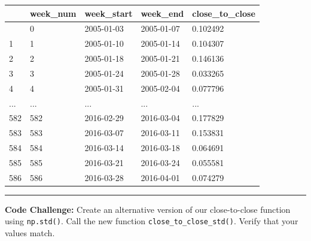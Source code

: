 \documentclass[
  letterpaper,
  DIV=11,
  numbers=noendperiod]{scrreprt}
\begin{document}
\begin{longtable}[]{@{}lllll@{}}
\toprule\noalign{}
& week\_num & week\_start & week\_end & close\_to\_close \\
\midrule\noalign{}
\endhead
\bottomrule\noalign{}
\endlastfoot
0 & 0 & 2005-01-03 & 2005-01-07 & 0.102492 \\
1 & 1 & 2005-01-10 & 2005-01-14 & 0.104307 \\
2 & 2 & 2005-01-18 & 2005-01-21 & 0.146136 \\
3 & 3 & 2005-01-24 & 2005-01-28 & 0.033265 \\
4 & 4 & 2005-01-31 & 2005-02-04 & 0.077796 \\
... & ... & ... & ... & ... \\
582 & 582 & 2016-02-29 & 2016-03-04 & 0.177829 \\
583 & 583 & 2016-03-07 & 2016-03-11 & 0.153831 \\
584 & 584 & 2016-03-14 & 2016-03-18 & 0.064691 \\
585 & 585 & 2016-03-21 & 2016-03-24 & 0.055581 \\
586 & 586 & 2016-03-28 & 2016-04-01 & 0.074279 \\
\end{longtable}

\begin{center}\rule{0.5\linewidth}{0.5pt}\end{center}

\textbf{Code Challenge:} Create an alternative version of our
close-to-close function using \texttt{np.std()}. Call the new function
\texttt{close\_to\_close\_std()}. Verify that your values match.
\end{document}
